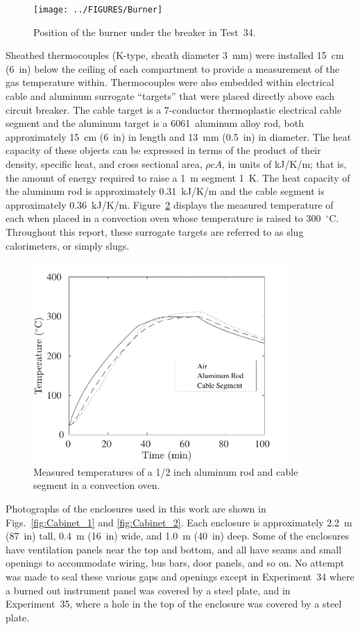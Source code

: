 \begin{figure}[ht]
\centering
\texttt{[image: ../FIGURES/Burner]}
\caption[Position of the burner] {Position of the burner under the breaker in Test~34.}
\label{fig:Burner}
\end{figure}

Sheathed thermocouples (K-type, sheath diameter 3~mm) were installed 15~cm (6~in) below the ceiling of each compartment to provide a measurement of the gas temperature within. Thermocouples were also embedded within electrical cable and aluminum surrogate ``targets'' that were placed directly above each circuit breaker. The cable target is a 7-conductor thermoplastic electrical cable segment and the aluminum target is a 6061~aluminum alloy rod, both approximately  15~cm (6~in) in length and 13~mm (0.5~in) in diameter. The heat capacity of these objects can be expressed in terms of the product of their density, specific heat, and cross sectional area, $\rho c A$, in units of kJ/K/m; that is, the amount of energy required to raise a 1~m segment 1~K. The heat capacity of the aluminum rod is approximately 0.31~kJ/K/m and the cable segment is approximately 0.36~kJ/K/m. Figure~\ref{oven} displays the measured temperature of each when placed in a convection oven whose temperature is raised to 300~$^\circ$C. Throughout this report, these surrogate targets are referred to as slug calorimeters, or simply slugs.

\begin{figure}[!ht]
\centering
\includegraphics[height=3.0in]{../SCRIPT_FIGURES/Oven_Test}
\caption[Measured temperatures of slug calorimeters in a convection oven]{Measured temperatures of a 1/2 inch aluminum rod and cable segment in a convection oven.}
\label{oven}
\end{figure}

Photographs of the enclosures used in this work are shown in Figs.~\ref{fig:Cabinet_1} and \ref{fig:Cabinet_2}. Each enclosure is approximately 2.2~m (87~in) tall, 0.4~m (16~in) wide, and 1.0~m (40~in) deep. Some of the enclosures have ventilation panels near the top and bottom, and all have seams and small openings to accommodate wiring, bus bars, door panels, and so on. No attempt was made to seal these various gaps and openings except in Experiment~34 where a burned out instrument panel was covered by a steel plate, and in Experiment~35, where a hole in the top of the enclosure was covered by a steel plate.



